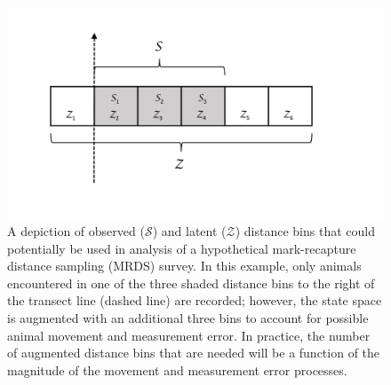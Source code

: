 \documentclass[12pt,fleqn]{article}
\begin{document}
\pagebreak
\begin{figure}
\begin{center}
\includegraphics[width=150mm]{augmented_bin_figure.pdf}
\caption{A depiction of observed ($\mathcal{S}$) and latent ($\mathcal{Z}$) distance bins that could potentially be used in analysis of a hypothetical mark-recapture distance sampling (MRDS) survey.  In this example, only animals encountered in one of the three shaded distance bins to the right of the transect line (dashed line) are recorded; however, the state space is augmented with an additional three bins to account for possible animal movement and measurement error.  In practice, the number of augmented distance bins that are needed will be a function of the magnitude of the movement and measurement error processes.}
\label{fig:aug_bins}
\end{center}
\end{figure}
\end{document}
